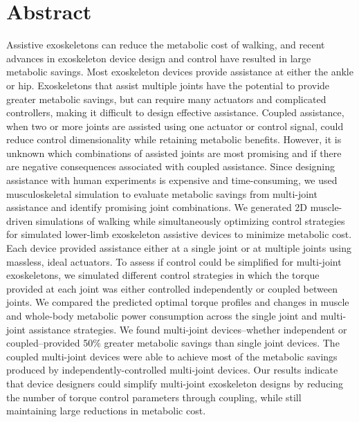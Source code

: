 \documentclass[10pt,letterpaper]{article}
\begin{document}
\section*{Abstract}
Assistive exoskeletons can reduce the metabolic cost of walking, and recent advances in exoskeleton device design and control have resulted in large metabolic savings. Most exoskeleton devices provide assistance at either the ankle or hip. Exoskeletons that assist multiple joints have the potential to provide greater metabolic savings, but can require many actuators and complicated controllers, making it difficult to design effective assistance. Coupled assistance, when two or more joints are assisted using one actuator or control signal, could reduce control dimensionality while retaining metabolic benefits. However, it is unknown which combinations of assisted joints are most promising and if there are negative consequences associated with coupled assistance. Since designing assistance with human experiments is expensive and time-consuming, we used musculoskeletal simulation to evaluate metabolic savings from multi-joint assistance and identify promising joint combinations. We generated 2D muscle-driven simulations of walking while simultaneously optimizing control strategies for simulated lower-limb exoskeleton assistive devices to minimize metabolic cost. Each device provided assistance either at a single joint or at multiple joints using massless, ideal actuators. To assess if control could be simplified for multi-joint exoskeletons, we simulated different control strategies in which the torque provided at each joint was either controlled independently or coupled between joints. We compared the predicted optimal torque profiles and changes in muscle and whole-body metabolic power consumption across the single joint and multi-joint assistance strategies. We found multi-joint devices--whether independent or coupled--provided 50\% greater metabolic savings than single joint devices. The coupled multi-joint devices were able to achieve most of the metabolic savings produced by independently-controlled multi-joint devices. Our results indicate that device designers could simplify multi-joint exoskeleton designs by reducing the number of torque control parameters through coupling, while still maintaining large reductions in metabolic cost. 

\linenumbers
\end{document}
